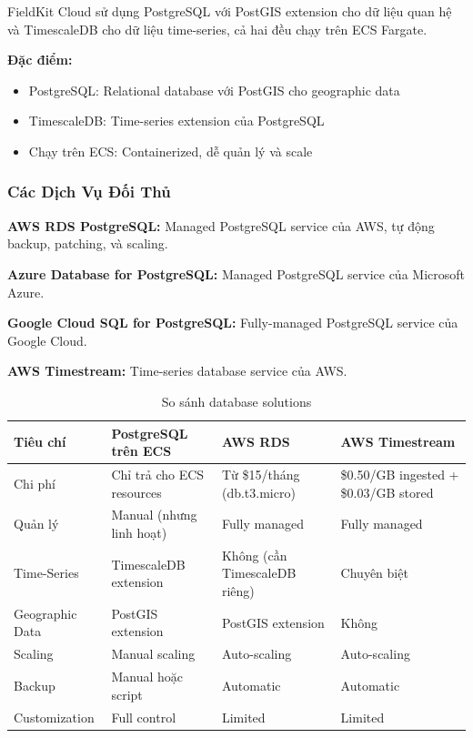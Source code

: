 FieldKit Cloud sử dụng PostgreSQL với PostGIS extension cho dữ liệu quan hệ và TimescaleDB cho dữ liệu time-series, cả hai đều chạy trên ECS Fargate.

\textbf{Đặc điểm:}
\begin{itemize}
    \item PostgreSQL: Relational database với PostGIS cho geographic data
    \item TimescaleDB: Time-series extension của PostgreSQL
    \item Chạy trên ECS: Containerized, dễ quản lý và scale
\end{itemize}

\subsubsection{Các Dịch Vụ Đối Thủ}

\textbf{AWS RDS PostgreSQL:} Managed PostgreSQL service của AWS, tự động backup, patching, và scaling.

\textbf{Azure Database for PostgreSQL:} Managed PostgreSQL service của Microsoft Azure.

\textbf{Google Cloud SQL for PostgreSQL:} Fully-managed PostgreSQL service của Google Cloud.

\textbf{AWS Timestream:} Time-series database service của AWS.

\begin{table}[H]
\centering
\caption{So sánh database solutions}
\label{tab:so-sanh-database}
\begin{tabular}{|p{2.5cm}|p{3.5cm}|p{3.5cm}|p{3.5cm}|}
\hline
\textbf{Tiêu chí} & \textbf{PostgreSQL trên ECS} & \textbf{AWS RDS} & \textbf{AWS Timestream} \\
\hline
Chi phí & Chỉ trả cho ECS resources & Từ \$15/tháng (db.t3.micro) & \$0.50/GB ingested + \$0.03/GB stored \\
\hline
Quản lý & Manual (nhưng linh hoạt) & Fully managed & Fully managed \\
\hline
Time-Series & TimescaleDB extension & Không (cần TimescaleDB riêng) & Chuyên biệt \\
\hline
Geographic Data & PostGIS extension & PostGIS extension & Không \\
\hline
Scaling & Manual scaling & Auto-scaling & Auto-scaling \\
\hline
Backup & Manual hoặc script & Automatic & Automatic \\
\hline
Customization & Full control & Limited & Limited \\
\hline
\end{tabular}
\end{table}

